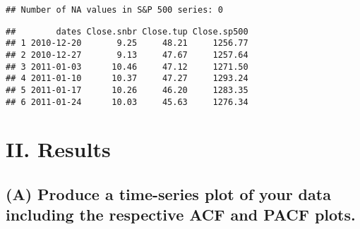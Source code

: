 \documentclass[
  10.5pt,
]{article}
\newenvironment{Shaded}{\begin{snugshade}}{\end{snugshade}}
\newcommand{\CommentTok}[1]{\textcolor[rgb]{0.56,0.35,0.01}{\textit{#1}}}
\newcommand{\FunctionTok}[1]{\textcolor[rgb]{0.00,0.00,0.00}{#1}}
\newcommand{\NormalTok}[1]{#1}
\newcommand{\OtherTok}[1]{\textcolor[rgb]{0.56,0.35,0.01}{#1}}
\newcommand{\SpecialCharTok}[1]{\textcolor[rgb]{0.00,0.00,0.00}{#1}}
\newcommand{\StringTok}[1]{\textcolor[rgb]{0.31,0.60,0.02}{#1}}
\begin{document}
\begin{verbatim}
## Number of NA values in S&P 500 series: 0
\end{verbatim}

\begin{Shaded}
\end{Shaded}

\begin{verbatim}
##        dates Close.snbr Close.tup Close.sp500
## 1 2010-12-20       9.25     48.21     1256.77
## 2 2010-12-27       9.13     47.67     1257.64
## 3 2011-01-03      10.46     47.12     1271.50
## 4 2011-01-10      10.37     47.27     1293.24
## 5 2011-01-17      10.26     46.20     1283.35
## 6 2011-01-24      10.03     45.63     1276.34
\end{verbatim}

\newpage

\hypertarget{ii.-results}{%
\section{II. Results}\label{ii.-results}}

\hypertarget{a-produce-a-time-series-plot-of-your-data-including-the-respective-acf-and-pacf-plots.}{%
\subsection{(A) Produce a time-series plot of your data including the
respective ACF and PACF
plots.}\label{a-produce-a-time-series-plot-of-your-data-including-the-respective-acf-and-pacf-plots.}}
\end{document}

